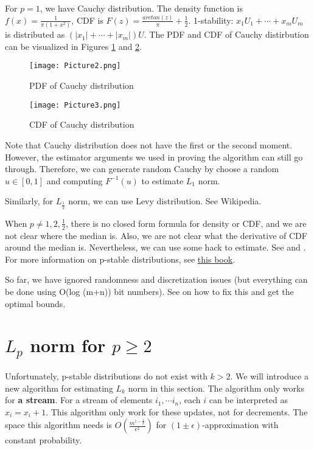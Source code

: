 \documentclass[11pt]{article}
\begin{document}
For $p=1$, we have Cauchy distribution. The density function is $f(x) = \frac{1}{\pi (1+x^2)}$, CDF is $F(z) = \frac{arctan(z)}{\pi} + \frac{1}{2}$. 1-stability: $x_1U_1 + \cdots + x_m U_m$ is distributed as $(|x_1|+ \cdots +|x_m|)U$. The PDF and CDF of Cauchy distirbution can be visualized in Figures \ref{fig:fig2} and \ref{fig:fig3}.

\begin{figure}[h]
\centering
\texttt{[image: Picture2.png]}
\caption{PDF of Cauchy distribution}
\label{fig:fig2}
\end{figure}

\begin{figure}[h]
\centering
\texttt{[image: Picture3.png]}
\caption{CDF of Cauchy distribution}
\label{fig:fig3}
\end{figure}

Note that Cauchy distribution does not have the first or the second moment. However, the estimator arguments we used in proving the algorithm can still go through. Therefore, we can generate random Cauchy by choose a random $u \in [0,1]$ and computing $F^{-1}(u)$ to estimate $L_1$ norm. 

Similarly, for $L_{\frac{1}{2}}$ norm, we can use Levy distribution. See Wikipedia.

When $p \ne 1, 2, \frac{1}{2}$, there is no closed form formula for density or CDF, and we are not clear where the median is. Also, we are not clear what the derivative of CDF around the median is. Nevertheless, we can use some hack to estimate. See \cite{indyk2000stable} and \cite{Li}. For more information on p-stable distributions, see \href{http://staff.ulsu.ru/uchaikin/uchzol.pdf}{{\color{blue}this book}}.

So far, we have ignored randomness and discretization issues (but everything can be done using O(log (m+n)) bit numbers). See \cite{Kane2010} on how to fix this and get the optimal bounds.

\section{$L_p$ norm for $p \ge 2$}
Unfortunately, p-stable distributions do not exist with $k > 2$. We will introduce a new algorithm for estimating $L_k$ norm in this section. The algorithm only works for \textbf{a stream}. For a stream of elements $i_1, \cdots i_n$, each $i$ can be interpreted as $x_i = x_i + 1$. This algorithm only work for these updates, not for decrements. The space this algorithm needs is $O(\frac{m^{1-\frac{1}{k}}}{\epsilon^2})$ for $(1 \pm \epsilon)$-approximation with constant probability.
\end{document}
